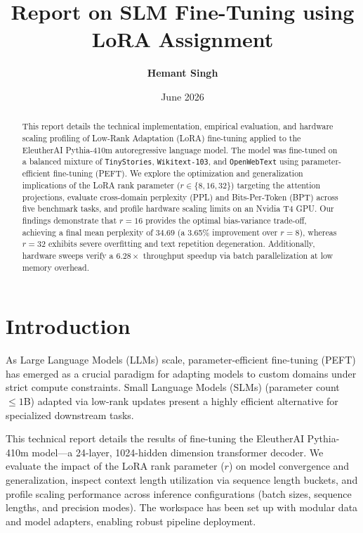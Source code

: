 \documentclass[11pt,a4paper]{article}
\title{\textbf{Report on SLM Fine-Tuning using LoRA Assignment}}
\author{\textbf{Hemant Singh}}
\date{June 2026}
\begin{document}
\maketitle

\begin{abstract}
This report details the technical implementation, empirical evaluation, and hardware scaling profiling of Low-Rank Adaptation (LoRA) fine-tuning applied to the EleutherAI Pythia-410m autoregressive language model. The model was fine-tuned on a balanced mixture of \texttt{TinyStories}, \texttt{Wikitext-103}, and \texttt{OpenWebText} using parameter-efficient fine-tuning (PEFT). We explore the optimization and generalization implications of the LoRA rank parameter ($r \in \{8, 16, 32\}$) targeting the attention projections, evaluate cross-domain perplexity (PPL) and Bits-Per-Token (BPT) across five benchmark tasks, and profile hardware scaling limits on an Nvidia T4 GPU. Our findings demonstrate that $r=16$ provides the optimal bias-variance trade-off, achieving a final mean perplexity of $34.69$ (a 3.65\% improvement over $r=8$), whereas $r=32$ exhibits severe overfitting and text repetition degeneration. Additionally, hardware sweeps verify a $6.28\times$ throughput speedup via batch parallelization at low memory overhead.
\end{abstract}

\section{Introduction}
As Large Language Models (LLMs) scale, parameter-efficient fine-tuning (PEFT) has emerged as a crucial paradigm for adapting models to custom domains under strict compute constraints. Small Language Models (SLMs) (parameter count $\le 1$B) adapted via low-rank updates present a highly efficient alternative for specialized downstream tasks. 

This technical report details the results of fine-tuning the EleutherAI Pythia-410m model—a 24-layer, 1024-hidden dimension transformer decoder. We evaluate the impact of the LoRA rank parameter ($r$) on model convergence and generalization, inspect context length utilization via sequence length buckets, and profile scaling performance across inference configurations (batch sizes, sequence lengths, and precision modes). The workspace has been set up with modular data and model adapters, enabling robust pipeline deployment.
\end{document}
